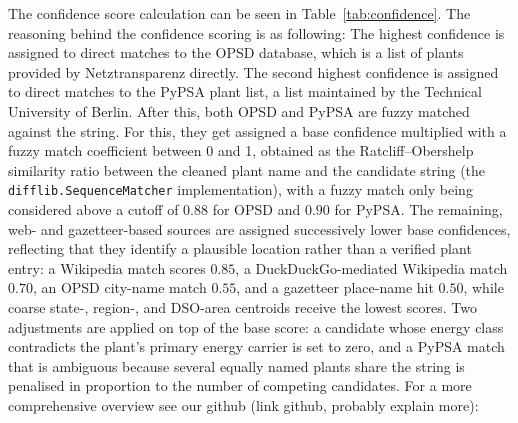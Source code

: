 The confidence score calculation can be seen in Table~\ref{tab:confidence}. The
reasoning behind the confidence scoring is as following: The highest confidence
is assigned to direct matches to the OPSD database, which is a list of plants
provided by Netztransparenz directly. The second highest confidence is assigned
to direct matches to the PyPSA plant list, a list maintained by the Technical
University of Berlin. After this, both OPSD and PyPSA are fuzzy matched against
the string. For this, they get assigned a base confidence multiplied with a
fuzzy match coefficient between 0 and 1, obtained as the Ratcliff--Obershelp
similarity ratio between the cleaned plant name and the candidate string (the
\texttt{difflib.SequenceMatcher} implementation), with a fuzzy match only being
considered above a cutoff of $0.88$ for OPSD and $0.90$ for PyPSA. The remaining,
web- and gazetteer-based sources are assigned successively lower base
confidences, reflecting that they identify a plausible location rather than a
verified plant entry: a Wikipedia match scores $0.85$, a DuckDuckGo-mediated
Wikipedia match $0.70$, an OPSD city-name match $0.55$, and a gazetteer
place-name hit $0.50$, while coarse state-, region-, and DSO-area centroids
receive the lowest scores. Two adjustments are applied on top of the base score:
a candidate whose energy class contradicts the plant's primary energy carrier is
set to zero, and a PyPSA match that is ambiguous because several equally named
plants share the string is penalised in proportion to the number of competing
candidates. For a more comprehensive overview see our github (link github,
probably explain more):
